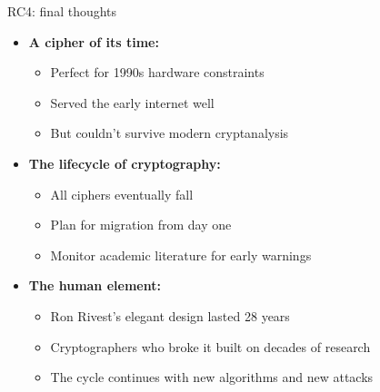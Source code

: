 \documentclass[aspectratio=169, lualatex, handout]{beamer}
\begin{document}
\begin{frame}{RC4: final thoughts}
	\begin{itemize}
		\item \textbf{A cipher of its time:}
		      \begin{itemize}
			      \item Perfect for 1990s hardware constraints
			      \item Served the early internet well
			      \item But couldn't survive modern cryptanalysis
		      \end{itemize}
		\item \textbf{The lifecycle of cryptography:}
		      \begin{itemize}
			      \item All ciphers eventually fall
			      \item Plan for migration from day one
			      \item Monitor academic literature for early warnings
		      \end{itemize}
		\item \textbf{The human element:}
		      \begin{itemize}
			      \item Ron Rivest's elegant design lasted 28 years
			      \item Cryptographers who broke it built on decades of research
			      \item The cycle continues with new algorithms and new attacks
		      \end{itemize}
	\end{itemize}
\end{frame}

\begin{frame}[plain]
	\titlepage
\end{frame}
\end{document}
